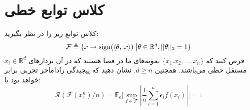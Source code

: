 \section{کلاس توابع خطی}
کلاس توابع زیر را در نظر بگیرید:
$$\mathcal{F} \triangleq \{x \to \operatorname*{sign}(\langle\theta, \: x\rangle) \; \big| \theta \in \mathbb{R}^d, ||\theta||_2 =1\}$$
فرض کنید که 
$\{x_1. x_2, \hdots, x_n\}$
نمونه‌های ما در فضا هستند که در آن بردار‌های
$x_i \in \mathbb{R}^d$
مستقل خطی می‌باشند. همچنین 
$d \geq n$.
نشان دهید که پیچیدگی راداماخر تجربی برابر خواهد بود با:
$$\mathcal{R}(\mathcal{F}(x_1^n)/n)= \mathbb{E}_\epsilon \big[\sup_{f \in \mathcal{F}}|\frac{1}{n} \sum_{i=1}^n \epsilon_i f(x_i)| \big]= 1$$ 